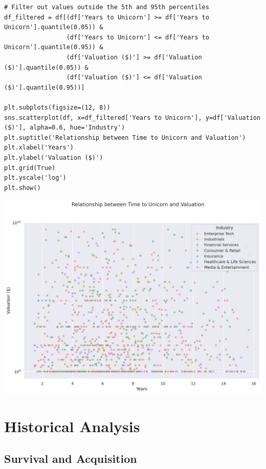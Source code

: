 \documentclass[a4paper,12pt]{article}
\begin{document}
\begin{verbatim}
# Filter out values outside the 5th and 95th percentiles
df_filtered = df[(df['Years to Unicorn'] >= df['Years to Unicorn'].quantile(0.05)) &
                 (df['Years to Unicorn'] <= df['Years to Unicorn'].quantile(0.95)) &
                 (df['Valuation ($)'] >= df['Valuation ($)'].quantile(0.05)) &
                 (df['Valuation ($)'] <= df['Valuation ($)'].quantile(0.95))]

plt.subplots(figsize=(12, 8))
sns.scatterplot(df, x=df_filtered['Years to Unicorn'], y=df['Valuation ($)'], alpha=0.6, hue='Industry')
plt.suptitle('Relationship between Time to Unicorn and Valuation')
plt.xlabel('Years')
plt.ylabel('Valuation ($)')
plt.grid(True)
plt.yscale('log')
plt.show()
\end{verbatim}

\begin{center}
\includegraphics[width=.9\linewidth]{./.ob-jupyter/ab345d53297c74faf9b4e92ff3afa494318d36dc.png}
\label{}
\end{center}
\section{Historical Analysis}
\label{sec:org41303c0}
\subsection{Survival and Acquisition}
\label{sec:org7e07482}
\end{document}
